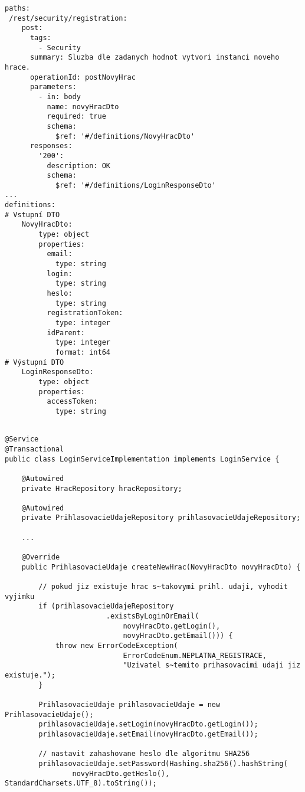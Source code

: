 \documentclass[twoside, 12pt]{article}
\begin{document}
{{\begin{lstlisting}
paths:
 /rest/security/registration:
    post:
      tags:
        - Security
      summary: Sluzba dle zadanych hodnot vytvori instanci noveho hrace.
      operationId: postNovyHrac
      parameters:
        - in: body
          name: novyHracDto
          required: true
          schema:
            $ref: '#/definitions/NovyHracDto'
      responses:
        '200':
          description: OK
          schema:
            $ref: '#/definitions/LoginResponseDto'
...
definitions:
# Vstupní DTO
    NovyHracDto:
        type: object
        properties:
          email:
            type: string
          login:
            type: string
          heslo:
            type: string
          registrationToken:
            type: integer
          idParent:
            type: integer
            format: int64
# Výstupní DTO
    LoginResponseDto:
        type: object
        properties:
          accessToken:
            type: string
\end{lstlisting}


\begin{lstlisting}

@Service
@Transactional
public class LoginServiceImplementation implements LoginService {

    @Autowired
    private HracRepository hracRepository;

    @Autowired
    private PrihlasovacieUdajeRepository prihlasovacieUdajeRepository;

    ...

    @Override
    public PrihlasovacieUdaje createNewHrac(NovyHracDto novyHracDto) {

        // pokud jiz existuje hrac s~takovymi prihl. udaji, vyhodit vyjimku
        if (prihlasovacieUdajeRepository
                        .existsByLoginOrEmail(
                            novyHracDto.getLogin(),
                            novyHracDto.getEmail())) {
            throw new ErrorCodeException(
                            ErrorCodeEnum.NEPLATNA_REGISTRACE,
                            "Uzivatel s~temito prihasovacimi udaji jiz existuje.");
        }

        PrihlasovacieUdaje prihlasovacieUdaje = new PrihlasovacieUdaje();
        prihlasovacieUdaje.setLogin(novyHracDto.getLogin());
        prihlasovacieUdaje.setEmail(novyHracDto.getEmail());

        // nastavit zahashovane heslo dle algoritmu SHA256
        prihlasovacieUdaje.setPassword(Hashing.sha256().hashString(
                novyHracDto.getHeslo(), StandardCharsets.UTF_8).toString());


\end{lstlisting}}}
\end{document}
